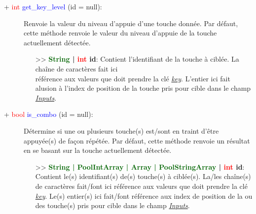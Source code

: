 \documentclass[a4paper, 11pt]{article}
\begin{document}
	\begin{description}
		\item [+ \textcolor{red}{int} \textcolor{blue}{get\_key\_level} (id = null):] Renvoie la valeur du 
		niveau d'appuie d'une touche donnée. Par défaut, cette méthode renvoie le valeur du niveau d'appuie 
		de la touche actuellement détectée.
		\begin{itemize}
			\item [>> \textbf{\textcolor{darkgreen}{String} | \textcolor{red}{int} id}:] Contient 
			l'identifiant de la touche à ciblée. La chaîne de caractères fait ici \\référence aux valeurs 
			que doit prendre la clé \textit{\hyperlink{key}{key}}. L'entier ici fait alusion à l'index de 
			position de la touche pris pour cible dans le champ \textit{\hyperlink{inputs}{Inputs}}.\\
		\end{itemize}
	\end{description}
	\begin{description}
		\item [+ \textcolor{red}{bool} \textcolor{blue}{is\_combo} (id = null):] Détermine si une ou 
		plusieurs touche(s) est/sont en traint d'être appuyée(s) de façon répétée. Par défaut, cette méthode 
		renvoie un résultat en se basant sur la touche actuellement détectée.
		\begin{itemize}
			\item [>> \textbf{\textcolor{darkgreen}{String | PoolIntArray | Array | PoolStringArray} |
			\textcolor{red}{int} id}:] Contient le(s) identifiant(s) de(s) touche(s) à ciblée(s). La/les 
			chaîne(s) de caractères fait/font ici référence aux valeurs que doit prendre la clé
			\textit{\hyperlink{key}{key}}. Le(s) entier(s) ici fait/font référence aux index de position de 
			la ou des touche(s) pris pour cible dans le champ \textit{\hyperlink{inputs}{Inputs}}.\\
		\end{itemize}
	\end{description}
\end{document}
